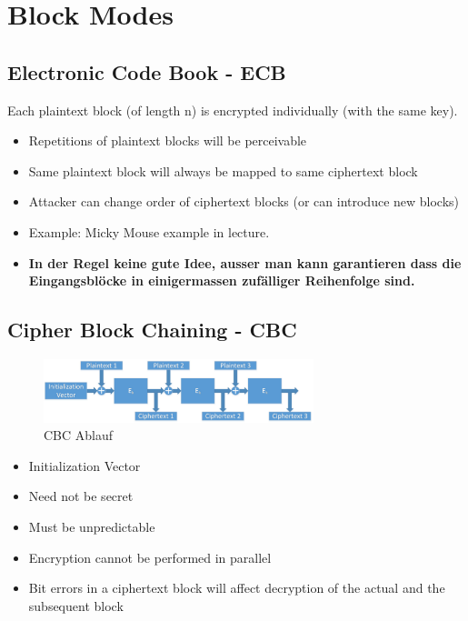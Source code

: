 \hypertarget{block-modes}{%
\section{Block Modes}\label{block-modes}}

\hypertarget{electronic-code-book---ecb}{%
\subsection{Electronic Code Book -
ECB}\label{electronic-code-book---ecb}}

Each plaintext block (of length n) is encrypted individually (with the
same key).

\begin{itemize}
\tightlist
\item
  Repetitions of plaintext blocks will be perceivable
\item
  Same plaintext block will always be mapped to same ciphertext block
\item
  Attacker can change order of ciphertext blocks (or can introduce new
  blocks)
\item
  Example: Micky Mouse example in lecture.
\item
  \textbf{In der Regel keine gute Idee, ausser man kann garantieren dass
  die Eingangsblöcke in einigermassen zufälliger Reihenfolge sind.}
\end{itemize}

\hypertarget{cipher-block-chaining---cbc}{%
\subsection{Cipher Block Chaining -
CBC}\label{cipher-block-chaining---cbc}}

\begin{figure}[H]
\centering
\includegraphics[width=0.7\textwidth]{figures/CBC.png}
\caption{CBC Ablauf}
\end{figure}

\begin{itemize}
    \item Initialization Vector
    \item Need not be secret
    \item Must be unpredictable
    \item Encryption cannot be performed in parallel
    \item Bit errors in a ciphertext block will affect decryption of the actual and the subsequent block
\end{itemize}

